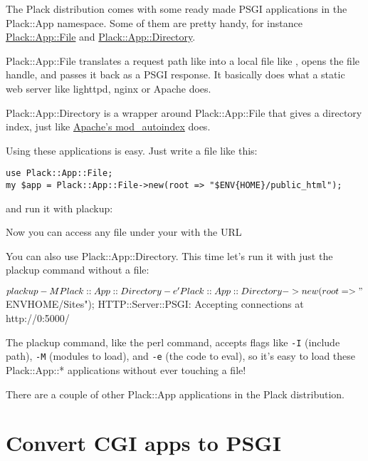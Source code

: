 The Plack distribution comes with some ready made PSGI applications in
the Plack::App namespace. Some of them are pretty handy, for instance
\href{http://search.cpan.org/perldoc?Plack::App::File}{Plack::App::File}
and
\href{http://search.cpan.org/perldoc?Plack::App::Directory}{Plack::App::Directory}.

Plack::App::File translates a request path like
 into a local file like
, opens the file handle, and
passes it back as a PSGI response. It basically does what a static web
server like lighttpd, nginx or Apache does.

Plack::App::Directory is a wrapper around Plack::App::File that gives a
directory index, just like
\href{http://httpd.apache.org/docs/2.0/mod/mod_autoindex.html}{Apache's
mod\_autoindex} does.

Using these applications is easy. Just write a  file like this:

\begin{lstlisting}
use Plack::App::File;
my $app = Plack::App::File->new(root => "$ENV{HOME}/public_html");
\end{lstlisting}

and run it with plackup:


Now you can access any file under your  with
the URL 

You can also use Plack::App::Directory. This time let's run it with just
the plackup command without a  file:

\begin{shell}
$ plackup -MPlack::App::Directory -e 'Plack::App::Directory->new(root => "$ENV{HOME}/Sites");
HTTP::Server::PSGI: Accepting connections at http://0:5000/
\end{shell}

The plackup command, like the perl command, accepts flags like
\lstinline!-I! (include path), \lstinline!-M! (modules to load), and
\lstinline!-e! (the code to eval), so it's easy to load these
Plack::App::* applications without ever touching a  file!

There are a couple of other Plack::App applications in the Plack
distribution.

\chapter{Convert CGI apps to
PSGI}\label{day-6-convert-cgi-apps-to-psgi}

